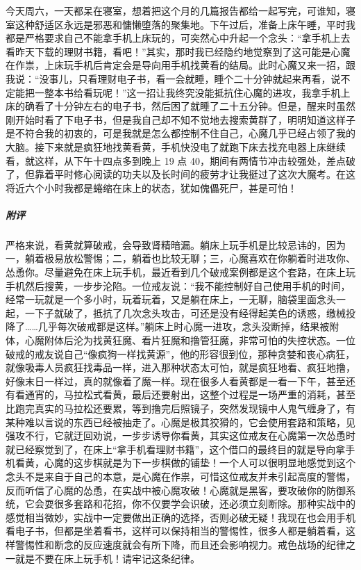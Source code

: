 \begin{case}
    今天周六，一天都呆在寝室，想着把这个月的几篇报告都给一起写完，可谁知，寝室这种舒适区永远是邪恶和慵懒堕落的聚集地。下午过后，准备上床午睡，平时我都是严格要求自己不能拿手机上床玩的，可突然心中升起一个念头：“拿手机上去看昨天下载的理财书籍，看吧！”其实，那时我已经隐约地觉察到了这可能是心魔在作祟，上床玩手机后肯定会是导向用手机找黄看的结局。此时心魔又来一招，跟我说：“没事儿，只看理财电子书，看一会就睡，睡个二十分钟就起来再看，说不定能把一整本书给看玩呢！”这一招让我终究没能抵抗住心魔的进攻，我拿手机上床的确看了十分钟左右的电子书，然后困了就睡了二十五分钟。但是，醒来时虽然刚开始时看了下电子书，但是我自己却不知不觉地去搜索黄群了，明明知道这样子是不符合我的初衷的，可是我就是怎么都控制不住自己，心魔几乎已经占领了我的大脑。接下来就是疯狂地找黄看黄，手机快没电了就跑下床去找充电器上床继续看，就这样，从下午十四点多到晚上 19 点 40，期间有两情节冲击较强处，差点破了，但靠着平时修心阅读的功夫以及长时间的疲劳才让我挺过了这次大魔考。在这将近六个小时我都是蜷缩在床上的状态，犹如傀儡死尸，甚是可怕！
    \subparagraph{附评} 严格来说，看黄就算破戒，会导致肾精暗漏。躺床上玩手机是比较忌讳的，因为一，躺着极易放松警惕；二，躺着也比较无聊；三，心魔喜欢在你躺着时进攻你、怂恿你。尽量避免在床上玩手机，最近看到几个破戒案例都是这个套路，在床上玩手机然后搜黄，一步步沦陷。一位戒友说：“我不能控制好自己使用手机的时间，经常一玩就是一个多小时，玩着玩着，又是躺在床上，一无聊，脑袋里面念头一起，一下子就破了，抵抗了几次念头攻击，可还是没有经得起美色的诱惑，缴械投降了……几乎每次破戒都是这样。”躺床上时心魔一进攻，念头没断掉，结果被附体，心魔附体后沦为找黄狂魔、看片狂魔和撸管狂魔，非常可怕的失控状态。一位破戒的戒友说自己“像疯狗一样找黄源”，他的形容很到位，那种贪婪和丧心病狂，就像吸毒人员疯狂找毒品一样，进入那种状态太可怕，就是疯狂地看、疯狂地撸，好像末日一样过，真的就像着了魔一样。现在很多人看黄都是一看一下午，甚至还有看通宵的，马拉松式看黄，最后还要射出，这整个过程是一场严重的消耗，甚至比跑完真实的马拉松还要累，等到撸完后照镜子，突然发现镜中人鬼气缠身了，有某种难以言说的东西已经被抽走了。心魔是极其狡猾的，它会使用套路和策略，见强攻不行，它就迂回劝说，一步步诱导你看黄，其实这位戒友在心魔第一次怂恿时就已经察觉到了，在床上“拿手机看理财书籍”，这个借口的最终目的就是导向拿手机看黄，心魔的这步棋就是为下一步棋做的铺垫！一个人可以很明显地感觉到这个念头不是来自于自己的本意，是心魔在作祟，可惜这位戒友并未引起高度的警惕，反而听信了心魔的怂恿，在实战中被心魔攻破！心魔就是黑客，要攻破你的防御系统，它会耍很多套路和花招，你不仅要学会识破，还必须立刻断除。那种实战中的感觉相当微妙，实战中一定要做出正确的选择，否则必破无疑！我现在也会用手机看电子书，但都是坐着看书，这样可以保持相当的警惕性，很多人都是躺着看，这样警惕性和断念的反应速度就会有所下降，而且还会影响视力。戒色战场的纪律之一就是不要在床上玩手机！请牢记这条纪律。
\end{case}


